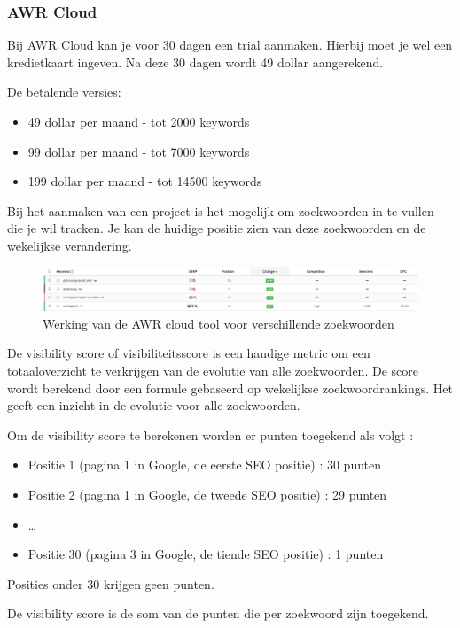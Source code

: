 \subsubsection{AWR Cloud}
\label{ch: AWR Cloud}
Bij AWR Cloud kan je voor 30 dagen een trial aanmaken. Hierbij moet je wel een kredietkaart ingeven. Na deze 30 dagen wordt 49 dollar aangerekend. 

De betalende versies: 
\begin{itemize}
\item 49 dollar per maand - tot 2000 keywords
\item 99 dollar per maand - tot 7000 keywords
\item 199 dollar per maand - tot 14500 keywords
\end{itemize}

Bij het aanmaken van een project is het mogelijk om zoekwoorden in te vullen die je wil tracken. Je kan de huidige positie zien van deze zoekwoorden en de wekelijkse verandering. 

\begin{figure}[h!]
\centering
\includegraphics[width=\linewidth]{img/awrcloud.PNG}
\caption{Werking van de AWR cloud tool voor verschillende zoekwoorden
\autocite{awrcloud}}
\end{figure}

De visibility score of visibiliteitsscore is een handige metric om een totaaloverzicht te verkrijgen van de evolutie van alle zoekwoorden. De score wordt berekend door een formule gebaseerd op wekelijkse zoekwoordrankings. Het geeft een inzicht in de evolutie voor alle zoekwoorden. 

Om de visibility score te berekenen worden er punten toegekend als volgt :
\begin{itemize}
\item Positie 1 (pagina 1 in Google, de eerste SEO positie) : 30 punten
\item Positie 2 (pagina 1 in Google, de tweede SEO positie) : 29 punten
\item …
\item Positie 30 (pagina 3 in Google, de tiende SEO positie) : 1 punten
\end{itemize}
Posities onder 30 krijgen geen punten.

De visibility score is de som van de punten die per zoekwoord zijn toegekend.

